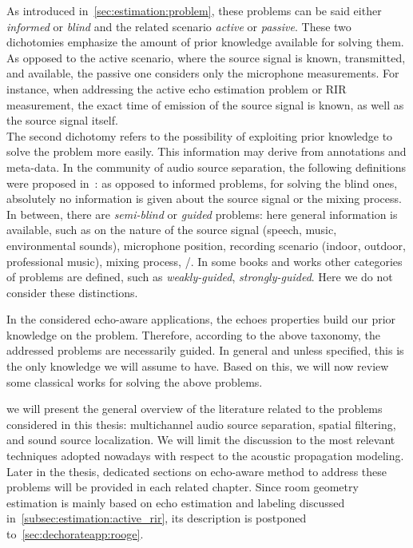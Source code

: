 \mynewline
As introduced in~\cref{sec:estimation:problem}, these problems can be said either \textit{informed} or \textit{blind} and the related scenario \textit{active} or \textit{passive}.
These two dichotomies emphasize the amount of prior knowledge available for solving them.
As opposed to the active scenario, where the source signal is known, transmitted, and available, the passive one considers only the microphone measurements.
For instance, when addressing the active echo estimation problem or \ac{RIR} measurement, the exact time of emission of the source signal is known, as well as the source signal itself.
\\The second dichotomy refers to the possibility of exploiting prior knowledge to solve the problem more easily.
This information may derive from annotations and meta-data.
In the community of audio source separation, the following definitions were proposed in~:
as opposed to informed problems, for solving the blind ones, absolutely no information is given about the source signal or the mixing process.
In between, there are \textit{semi-blind} or \textit{guided} problems:
here general information is available, such as on the nature of the source signal (speech, music, environmental sounds),
microphone position, recording scenario (indoor, outdoor, professional music), mixing process, \etc/.
In some books and works other categories of problems are defined, such as \emph{weakly-guided}, \emph{strongly-guided}.
Here we do not consider these distinctions.

\mynewline
In the considered echo-aware applications, the echoes properties build our prior knowledge on the problem.
Therefore, according to the above taxonomy, the addressed problems are necessarily guided.
In general and unless specified, this is the only knowledge we will assume to have.
Based on this, we will now review some classical works for solving the above problems.


 we will present the general overview of the literature related to the problems considered in this thesis: multichannel audio source separation, spatial filtering, and sound source localization.
We will limit the discussion to the most relevant techniques adopted nowadays with respect to the acoustic propagation modeling.
Later in the thesis, dedicated sections on echo-aware method to address these problems will be provided in each related chapter.
Since room geometry estimation is mainly based on echo estimation and labeling discussed in~\cref{subsec:estimation:active_rir}, its description is postponed to~\cref{sec:dechorateapp:rooge}.


